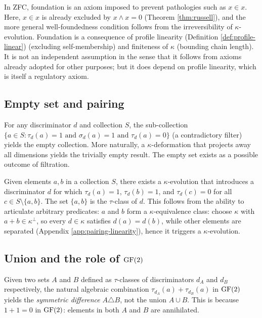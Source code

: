 \begin{remark}
In ZFC, foundation is an axiom imposed to prevent pathologies
such as $x \in x$. Here, $x \in x$ is already excluded by
$x \wedge x = 0$ (Theorem \ref{thm:russell}), and the more
general well-foundedness condition follows from the irreversibility
of $\kappa$-evolution. Foundation is a consequence of profile linearity (Definition \ref{def:profile-linear})
(excluding self-membership) and finiteness of $\kappa$
(bounding chain length). It is not an independent
assumption in the sense that it follows from axioms
already adopted for other purposes; but it does depend
on profile linearity, which is itself a regulatory axiom.
\end{remark}

\subsection{Empty set and pairing}

\begin{proposition}\label{prop:empty}
For any discriminator $d$ and collection $S$, the sub-collection
$\{a \in S : \tau_d(a) = 1 \text{ and } \sigma_d(a) = 1
\text{ and } \tau_d(a) = 0\}$ (a contradictory filter) yields
the empty collection. More naturally, a $\kappa$-deformation
that projects away all dimensions yields the trivially empty result.
The empty set exists as a possible outcome of filtration.
\end{proposition}

\begin{proposition}[Pairing]\label{prop:pairing}
Given elements $a, b$ in a collection $S$, there exists a
$\kappa$-evolution that introduces a discriminator $d$ for which
$\tau_d(a) = 1$, $\tau_d(b) = 1$, and $\tau_d(c) = 0$ for all
$c \in S \setminus \{a,b\}$. The set $\{a,b\}$ is the $\tau$-class
of $d$. This follows from the ability to articulate arbitrary
predicates: $a$ and $b$ form a $\kappa$-equivalence class:
choose $\kappa$ with $a + b \in \kappa^\perp$,
so every $d \in \kappa$ satisfies $d(a) = d(b)$,
while other elements are separated
(Appendix \ref{app:pairing-linearity}),
hence it triggers a $\kappa$-evolution.
\end{proposition}

\subsection{Union and the role of $\operatorname{GF}(2)$}

\begin{proposition}\label{prop:symdiff}
Given two sets $A$ and $B$ defined as $\tau$-classes of
discriminators $d_A$ and $d_B$ respectively, the natural
algebraic combination $\tau_{d_A}(a) + \tau_{d_B}(a)$ in
$\operatorname{GF}(2)$ yields the \emph{symmetric difference}
$A \triangle B$, not the union $A \cup B$. This is because
$1 + 1 = 0$ in $\operatorname{GF}(2)$: elements in both $A$ and $B$ are
annihilated.
\end{proposition}

